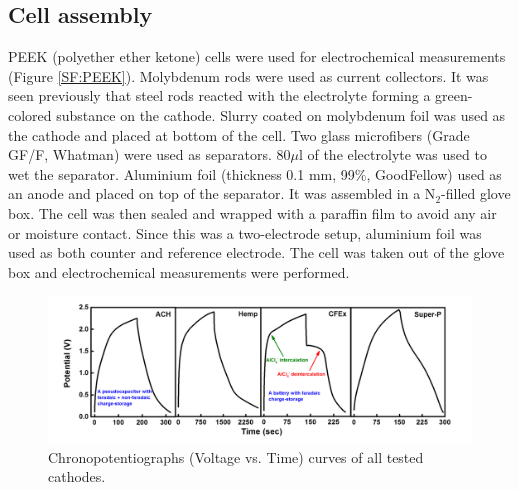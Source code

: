 \documentclass{article}
\begin{document}
\subsection{Cell assembly}
PEEK (polyether ether ketone) cells were used for electrochemical measurements (Figure \ref{SF:PEEK}). Molybdenum rods were used as current collectors. It was seen previously that steel rods reacted with the electrolyte forming a green-colored substance on the cathode. Slurry coated on molybdenum foil was used as the cathode and placed at bottom of the cell. Two glass microfibers (Grade GF/F, Whatman) were used as separators. 80$\mu$l of the electrolyte was used to wet the separator. Aluminium foil (thickness 0.1 mm, 99$\%$, GoodFellow) used as an anode and placed on top of the separator. It was assembled in a N$_2$-filled glove box. The cell was then sealed and wrapped with a paraffin film to avoid any air or moisture contact. Since this was a two-electrode setup, aluminium foil was used as both counter and reference electrode. The cell was taken out of the glove box and electrochemical measurements were performed. 

\begin{figure}[tbh!]
  \centering
  \includegraphics[width=\textwidth]{figures/GCDCall}
    \caption{Chronopotentiographs (Voltage vs. Time) curves of all tested cathodes.}
  \label{figures:GCDCall}
\end{figure}


 
\end{document}
